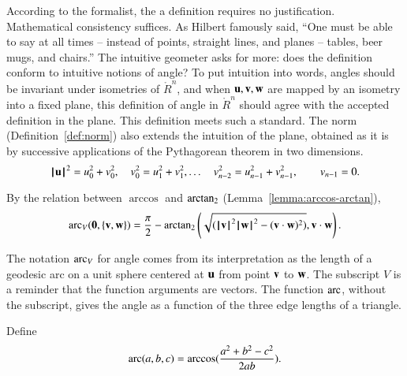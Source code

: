 \begin{tidbit}
  According to the formalist, the a definition requires no
  justification.  Mathematical consistency suffices.  As Hilbert
  famously said, ``One must be able to say at all times -- instead of
  points, straight lines, and planes -- tables, beer mugs, and
  chairs.''  The intuitive geometer asks for more: does the definition
  conform to intuitive notions of angle?  To put intuition into
  words, angles should be invariant under isometries of $\ring{R}^n$,
  and when ${\mathbf u},{\mathbf v},{\mathbf w}$ are mapped by an isometry into a fixed plane,
  this definition of angle in $\ring{R}^n$ should agree with the
  accepted definition in the plane.  This
  definition meets such a standard.  The norm (Definition~\ref{def:norm}) also
  extends the intuition of the plane, obtained as it is by successive
  applications of the Pythagorean theorem in two dimensions.
\[
{{\hskip0.1em|\hskip-0.15em|\hskip0.1em}{\mathbf u}{\hskip0.1em|\hskip-0.15em|\hskip0.1em}}^2 = u_0^2 + v_0^2,\quad v_0^2 = u_1^2 + v_1^2,\ldots
\quad v_{n-2}^2 = u_{n-1}^2 + v_{n-1}^2,\qquad v_{n-1}=0.
\]
\end{tidbit}

By the relation between $\arccos$ and ${\operatorname{arctan_2}}$
(Lemma~\ref{lemma:arccos-arctan}), %
\begin{equation}\label{eqn:angle}
  \operatorname{arc}_V({\mathbf 0},\{{\mathbf v},{\mathbf w}\}) = \frac{\pi}2 - {\operatorname{arctan_2}}\left ({\sqrt{({{\hskip0.1em|\hskip-0.15em|\hskip0.1em}{\mathbf v}{\hskip0.1em|\hskip-0.15em|\hskip0.1em}}^2{{\hskip0.1em|\hskip-0.15em|\hskip0.1em}{\mathbf w}{\hskip0.1em|\hskip-0.15em|\hskip0.1em}}^2 -
        ({\mathbf v}\cdot {\mathbf w})^2)}}, {{\mathbf v}\cdot {\mathbf w}}\right).
\end{equation}
%

The notation $\operatorname{arc}_V$ for angle comes from its interpretation as the
length of a geodesic arc on a unit sphere
centered at ${\mathbf u}$ from point ${\mathbf v}$ to ${\mathbf w}$.
%
The subscript $V$ is a reminder that
the function arguments are vectors.  The function
$\operatorname{arc}$, without the subscript,  gives the angle as a function
of the three edge lengths of a triangle.
%
%
%


\begin{definition}[arc]\label{def:arc}
Define
\[ \operatorname{arc}(a,b,c) = \arccos(\frac{a^2 + b^2 - c^2}{2 a
    b}).\] 
%
\end{definition}

